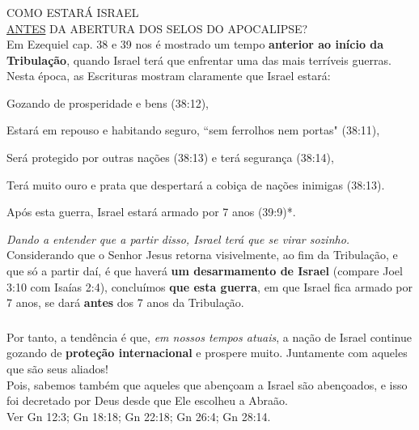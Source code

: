\documentclass[aspectratio=169]{beamer}
\begin{document}
\begin{frame}
	  \frametitle{}
	  \framesubtitle{}
	  \centering
	  {\large COMO ESTARÁ ISRAEL}\\
	  {\large \underline{ANTES} DA ABERTURA DOS SELOS DO APOCALIPSE?}\\
	  		\vspace{.3cm}
		Em Ezequiel cap. 38 e 39 nos é mostrado um tempo \textbf{anterior ao início da Tribulação}, quando Israel terá que enfrentar uma das mais terríveis guerras.\\
		\vspace{.3cm}
	Nesta época, as Escrituras mostram claramente que Israel estará:\\
    \begin{itemize}
    \scriptsize {
	      \item Gozando de prosperidade e bens (38:12),\\
	      \item Estará em repouso e habitando seguro, ``sem ferrolhos nem portas" (38:11),\\
	      \item Será protegido por outras nações (38:13) e terá segurança (38:14), \\
	      \item Terá muito ouro e prata que despertará a cobiça de nações inimigas (38:13). \\
        \item	Após esta guerra, Israel estará armado por 7 anos (39:9)*. \\
	    }
    \end{itemize}
	\textit{{\small *Dando a entender que a partir disso, Israel terá que se virar sozinho.}}\\
	\vspace{.3cm}
	Considerando que o Senhor Jesus retorna visivelmente, ao fim da Tribulação, e que só a partir daí, é que haverá \textbf{um desarmamento de Israel} (compare Joel 3:10 com Isaías 2:4), concluímos \textbf{que esta guerra}, em que Israel fica armado por 7 anos, se dará \textbf{antes} dos 7 anos da Tribulação.
	\end{frame}




\begin{frame}
	  \frametitle{}
	  \framesubtitle{}
	  \centering
		{\large Por tanto, a tendência é que, \textit{em nossos tempos atuais}, a nação de Israel continue gozando de \textbf{proteção internacional} e prospere muito. Juntamente com aqueles que são seus aliados!} \\
		\vspace{.5cm}
	Pois, sabemos também que aqueles que abençoam a Israel são abençoados, e isso foi decretado por Deus desde que Ele escolheu a Abraão.\\
	\vspace{.5cm} 
	Ver Gn 12:3; Gn 18:18; Gn 22:18; Gn 26:4; Gn 28:14.\\
	\end{frame}
	
\end{document}
